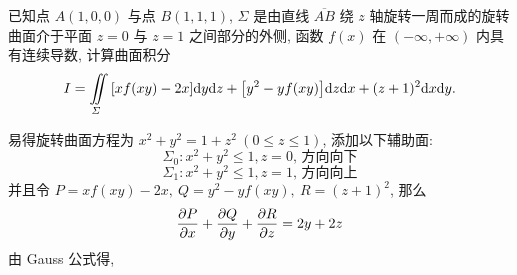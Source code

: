 \begin{example}
    已知点 $A(1,0,0)$ 与点 $B(1,1,1)$, $\varSigma$ 是由直线 $\overline{AB} $ 绕 $z$ 轴旋转一周而成的旋转曲面介于平面 $z=0$ 与 $z=1$ 之间部分的外侧, 
    函数 $f(x)$ 在 $(-\infty,+\infty)$ 内具有连续导数, 计算曲面积分 $$I=\iint\limits_\varSigma\qty[xf(xy)-2x]\dd y\dd z+\qty[y^2-yf(xy)]\dd z\dd x+(z+1)^2\dd x\dd y.$$
\end{example}
\begin{solution}
    易得旋转曲面方程为 $x^2+y^2=1+z^2~ (0\leqslant z\leqslant 1)$, 添加以下辅助面:
    $$\varSigma_0:x^2+y^2\leqslant 1,z=0\text{, 方向向下}$$
    $$\varSigma_1:x^2+y^2\leqslant 1,z=1\text{, 方向向上}$$
    并且令 $P=xf(xy)-2x,~Q=y^2-yf(xy),~R=(z+1)^2$, 那么
    $$\pdv{P}{x}+\pdv{Q}{y}+\pdv{R}{z}=2y+2z$$
    由 Gauss 公式得, 
\end{solution}


